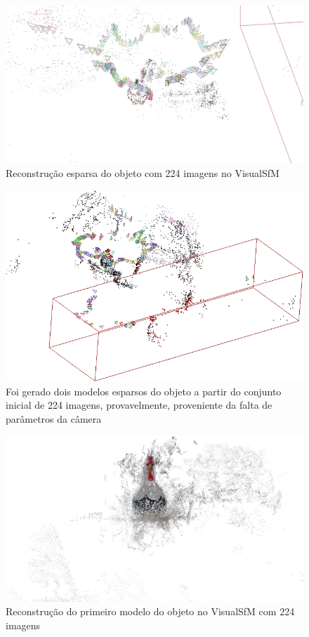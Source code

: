 \begin{figure}[!h]
	\centering
	\includegraphics[width=0.5\linewidth]{figs/perto_longe_esparsa.jpg}
	\caption{%
	Reconstrução esparsa do objeto com 224 imagens no VisualSfM
	}\label{fig:reconstrucaoEsparsaVisualSFM}
\end{figure}

\begin{figure}[!h]
	\centering
	\includegraphics[width=0.5\linewidth]{figs/perto_longe_esparsa_2.jpg}
	\caption{%
	Foi gerado dois modelos esparsos do objeto a partir do conjunto inicial de 224 imagens, provavelmente, proveniente da falta de parâmetros da câmera
	}\label{fig:reconstrucaoEsparsaVisualSFM224}
\end{figure}

\begin{figure}[!h]
	\centering
	\includegraphics[width=0.5\linewidth]{figs/galinhadense224.jpg}
	\caption{%
	Reconstrução do primeiro modelo do objeto no VisualSfM com 224 imagens
	}\label{fig:reconstrucaoDensaVisualSFM2241}
\end{figure}

